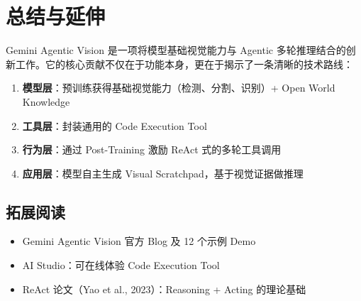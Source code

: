\documentclass[a4paper]{article}
\begin{document}
\section{总结与延伸}

Gemini Agentic Vision 是一项将模型基础视觉能力与 Agentic 多轮推理结合的创新工作。它的核心贡献不仅在于功能本身，更在于揭示了一条清晰的技术路线：

\begin{enumerate}
    \item \textbf{模型层}：预训练获得基础视觉能力（检测、分割、识别）+ Open World Knowledge
    \item \textbf{工具层}：封装通用的 Code Execution Tool
    \item \textbf{行为层}：通过 Post-Training 激励 ReAct 式的多轮工具调用
    \item \textbf{应用层}：模型自主生成 Visual Scratchpad，基于视觉证据做推理
\end{enumerate}

\subsection{拓展阅读}

\begin{itemize}
    \item Gemini Agentic Vision 官方 Blog 及 12 个示例 Demo
    \item AI Studio：可在线体验 Code Execution Tool
    \item ReAct 论文（Yao et al., 2023）：Reasoning + Acting 的理论基础
\end{itemize}

\end{document}
